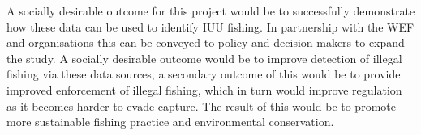 A socially desirable outcome for this project would be to successfully demonstrate how these data can be used to identify IUU fishing. In partnership with the WEF and organisations this can be conveyed to policy and decision makers to expand the study. A socially desirable outcome would be to improve detection of illegal fishing via these data sources, a secondary outcome of this would be to provide improved enforcement of illegal fishing, which in turn would improve regulation as it becomes harder to evade capture. The result of this would be to promote more sustainable fishing practice and environmental conservation.
